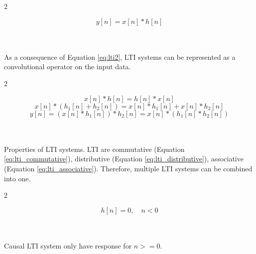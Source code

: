 \documentclass{article}
\theoremstyle{plain}
\newcommand{\myeq}[2]{
    \begin{multicols}{2}
            #1
    \columnbreak
        \\
        \\
        #2
    \end{multicols}
    \hrulefill
}
\begin{document}
\myeq{
 \begin{equation}
     y[n] = x[n] \ast h[n]
 \end{equation}
}{
    As a consequence of Equation \ref{eq:lti2}, LTI systems can be represented as a convolutional operator on the input data.
}

\myeq{
    \begin{equation} \label{eq:lti_commutative}
        x[n] \ast h[n] = h[n] \ast x[n] 
    \end{equation}
    \begin{equation} \label{eq:lti_distributive}
        x[n] \ast (h_1[n] + h_2[n]) = x[n]\ast h_1 [n] + x[n] \ast h_2[n]
    \end{equation}
    \begin{equation} \label{eq:lti_associative}
        y[n] = (x[n]\ast h_1[n])\ast h_2[n] = x[n] \ast (h_1[n] \ast h_2[n])
    \end{equation}
}{Properties of LTI systems. LTI are commutative (Equation \ref{eq:lti_commutative}), distributive (Equation \ref{eq:lti_distributive}), associative (Equation \ref{eq:lti_associative}). Therefore, multiple LTI systems can be combined into one.}

\myeq{
    \begin{equation}
        h[n] = 0 , \quad n < 0
    \end{equation}
}
{Causal LTI system only have response for $n>=0$.}
\end{document}
